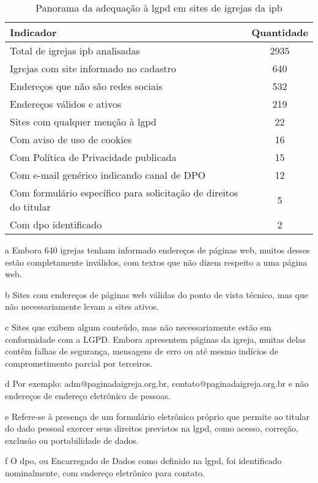 \begin{table}[H]
\centering
\begin{threeparttable}
\caption{Panorama da adequação à \gls{lgpd} em sites de igrejas da \gls{ipb}}
\label{tabela:panorama_adequacao_ipb}
\begin{tabularx}{\textwidth}{>{\raggedright\arraybackslash}X c}
\toprule
\textbf{Indicador} & \textbf{Quantidade} \\
\midrule
Total de igrejas \gls{ipb} analisadas & 2935 \\
Igrejas com site informado no cadastro\tnote{a} & 640 \\
Endereços que não são redes sociais\tnote{b} & 532 \\
Endereços válidos e ativos\tnote{c} & 219 \\
Sites com qualquer menção à \gls{lgpd} & 22 \\
Com aviso de uso de cookies & 16 \\
Com Política de Privacidade publicada & 15 \\
Com e-mail genérico indicando canal de DPO\tnote{d} & 12 \\
Com formulário específico para solicitação de direitos do titular\tnote{e} & 5 \\
Com \gls{dpo} identificado\tnote{f} & 2 \\
\bottomrule
\end{tabularx}
\begin{tablenotes}
\footnotesize
\item[a] Embora 640 igrejas tenham informado endereços de páginas web, muitos desses estão completamente inválidos, com textos que não dizem respeito a uma página web.
\item[b] Sites com endereços de páginas web válidas do ponto de vista técnico, mas que não necessariamente levam a sites ativos.
\item[c] Sites que exibem algum conteúdo, mas não necessariamente estão em conformidade com a LGPD. Embora apresentem páginas da igreja, muitas delas contêm falhas de segurança, mensagens de erro ou até mesmo indícios de comprometimento parcial por terceiros.
\item[d] Por exemplo: adm@paginadaigreja.org.br, contato@paginadaigreja.org.br e não endereços de endereço eletrônico de pessoas.
\item[e] Refere-se à presença de um formulário eletrônico próprio que permite ao titular do dado pessoal exercer seus direitos previstos na \gls{lgpd}, como acesso, correção, exclusão ou portabilidade de dados.
\item[f] O \gls{dpo}, ou Encarregado de Dados como definido na \gls{lgpd}, foi identificado nominalmente, com endereço eletrônico para contato.
\end{tablenotes}
\end{threeparttable}
\end{table}

